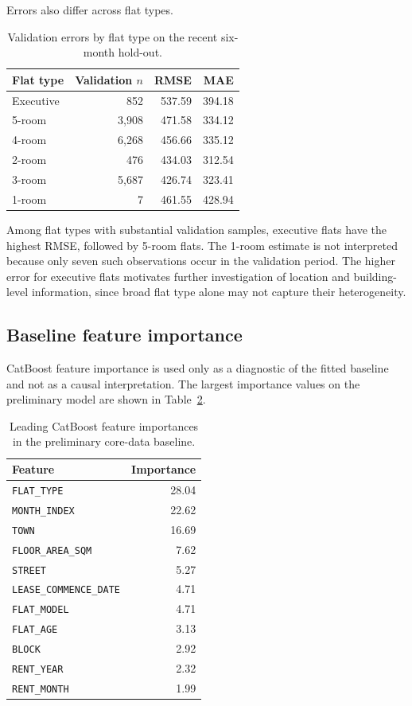 \documentclass[10pt]{article}
\begin{document}
Errors also differ across flat types.

\begin{table}[h]
\centering
\small
\begin{tabular}{lrrr}
\toprule
Flat type & Validation $n$ & RMSE & MAE \\
\midrule
Executive & 852 & 537.59 & 394.18 \\
5-room & 3{,}908 & 471.58 & 334.12 \\
4-room & 6{,}268 & 456.66 & 335.12 \\
2-room & 476 & 434.03 & 312.54 \\
3-room & 5{,}687 & 426.74 & 323.41 \\
1-room & 7 & 461.55 & 428.94 \\
\bottomrule
\end{tabular}
\caption{Validation errors by flat type on the recent six-month hold-out.}
\label{tab:flat-type-errors}
\end{table}

Among flat types with substantial validation samples, executive flats have the highest RMSE, followed by 5-room flats.
The 1-room estimate is not interpreted because only seven such observations occur in the validation period.
The higher error for executive flats motivates further investigation of location and building-level information, since broad flat type alone may not capture their heterogeneity.

\subsection{Baseline feature importance}

CatBoost feature importance is used only as a diagnostic of the fitted baseline and not as a causal interpretation.
The largest importance values on the preliminary model are shown in Table~\ref{tab:baseline-importance}.

\begin{table}[h]
\centering
\small
\begin{tabular}{lr}
\toprule
Feature & Importance \\
\midrule
\texttt{FLAT\_TYPE} & 28.04 \\
\texttt{MONTH\_INDEX} & 22.62 \\
\texttt{TOWN} & 16.69 \\
\texttt{FLOOR\_AREA\_SQM} & 7.62 \\
\texttt{STREET} & 5.27 \\
\texttt{LEASE\_COMMENCE\_DATE} & 4.71 \\
\texttt{FLAT\_MODEL} & 4.71 \\
\texttt{FLAT\_AGE} & 3.13 \\
\texttt{BLOCK} & 2.92 \\
\texttt{RENT\_YEAR} & 2.32 \\
\texttt{RENT\_MONTH} & 1.99 \\
\bottomrule
\end{tabular}
\caption{Leading CatBoost feature importances in the preliminary core-data baseline.}
\label{tab:baseline-importance}
\end{table}
\end{document}
